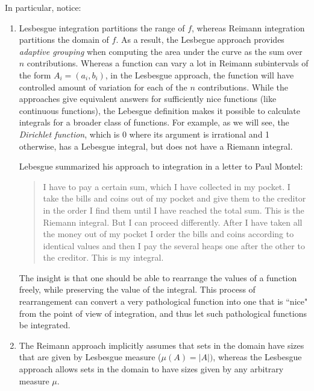 \documentclass{article} %
\begin{document}
 In particular, notice:
\begin{enumerate}
\item Lesbesgue integration partitions the range of $f$, whereas Reimann integration partitions the domain of $f$. As a result, the Lesbegue approach provides \textit{adaptive grouping} when computing the area under the curve as the sum over $n$ contributions.  Whereas a function can vary a lot in Reimann subintervals of the form $A_i = (a_i,b_i)$, in the Lesbesgue approach, the function will have controlled amount of variation for each of the $n$ contributions.  While the approaches give equivalent answers for sufficiently nice functions (like continuous functions), the Lebesgue definition makes it possible to calculate integrals for a broader class of functions. For example, as we will see, the \textit{Dirichlet function}, which is 0 where its argument is irrational and 1 otherwise, has a Lebesgue integral, but does not have a Riemann integral.

Lebesgue summarized his approach to integration in a letter to Paul Montel:
\begin{quotation}
I have to pay a certain sum, which I have collected in my pocket.  I take the bills and coins out of my pocket and give them to the creditor in the order I find them until I have reached the total sum. This is the Riemann integral. But I can proceed differently. After I have taken all the money out of my pocket I order the bills and coins according to identical values and then I pay the several heaps one after the other to the creditor. This is my integral.
\end{quotation}



The insight is that one should be able to rearrange the values of a function freely, while preserving the value of the integral.  This process of rearrangement can convert a very pathological function into one that is ``nice" from the point of view of integration, and thus let such pathological functions be integrated.

\item The Reimann approach implicitly assumes that sets in the domain have sizes that are given by Lesbesgue measure ($\mu(A) = |A|)$, whereas the Lesbesgue approach allows sets in the domain to have sizes given by any arbitrary measure $\mu$.
\end{enumerate}
\end{document}
